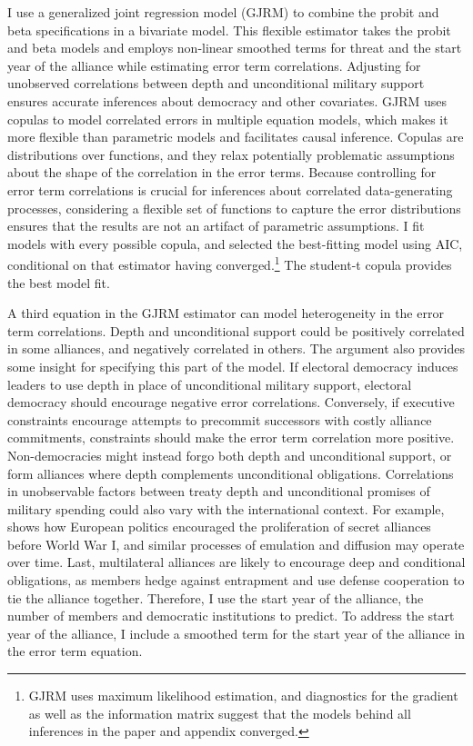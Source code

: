 \documentclass[12pt]{article}
\begin{document}
I use a generalized joint regression model (GJRM) \citep{Braumoelleretal2018} to combine the probit and beta specifications in a bivariate model.
This flexible estimator takes the probit and beta models and employs non-linear smoothed terms for threat and the start year of the alliance while estimating error term correlations. 
Adjusting for unobserved correlations between depth and unconditional military support ensures accurate inferences about democracy and other covariates.
GJRM uses copulas to model correlated errors in multiple equation models, which makes it more flexible than parametric models and facilitates causal inference. 
Copulas are distributions over functions, and they relax potentially problematic assumptions about the shape of the correlation in the error terms. 
Because controlling for error term correlations is crucial for inferences about correlated data-generating processes, considering a flexible set of functions to capture the error distributions ensures that the results are not an artifact of parametric assumptions. 
I fit models with every possible copula, and selected the best-fitting model using AIC, conditional on that estimator having converged.\footnote{GJRM uses maximum likelihood estimation, and diagnostics for the gradient as well as the information matrix suggest that the models behind all inferences in the paper and appendix converged.} 
The student-t copula provides the best model fit. 


A third equation in the GJRM estimator can model heterogeneity in the error term correlations. 
Depth and unconditional support could be positively correlated in some alliances, and negatively correlated in others. 
The argument also provides some insight for specifying this part of the model.  
If electoral democracy induces leaders to use depth in place of unconditional military support, electoral democracy should encourage negative error correlations. 
Conversely, if executive constraints encourage attempts to precommit successors with costly alliance commitments, constraints should make the error term correlation more positive.
Non-democracies might instead forgo both depth and unconditional support, or form alliances where depth complements unconditional obligations. 
Correlations in unobservable factors between treaty depth and unconditional promises of military spending could also vary with the international context.
For example, \citet{Kuo2019} shows how European politics encouraged the proliferation of secret alliances before World War I, and similar processes of emulation and diffusion may operate over time.
Last, multilateral alliances are likely to encourage deep and conditional obligations, as members hedge against entrapment and use defense cooperation to tie the alliance together. 
Therefore, I use the start year of the alliance, the number of members and democratic institutions to predict.
To address the start year of the alliance, I include a smoothed term for the start year of the alliance in the error term equation.  
\end{document}
